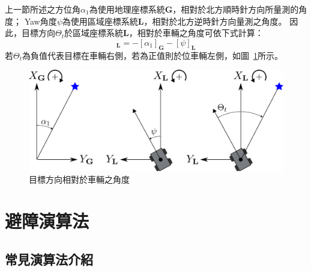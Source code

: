 上一節所述之方位角$\alpha_1$為使用地理座標系統$\mathbf{G}$，相對於北方順時針方向所量測的角度；
Yaw角度$\psi$為使用區域座標系統$\mathbf{L}$，相對於北方逆時針方向量測之角度。
因此，目標方向$\Theta_t$於區域座標系統$\mathbf{L}$，相對於車輛之角度可依下式計算：
\begin{equation}
	[\Theta_t]_{\mathbf{L}} = -[\alpha_1]_{\mathbf{G}} - [\psi]_{\mathbf{L}}
\end{equation}
若$\Theta_t$為負值代表目標在車輛右側，若為正值則於位車輛左側，如圖~\ref{f:target_angle}所示。
\begin{figure}[h!]
	\centering
	\includegraphics[width=\textwidth]{figures/algorithm/TargetAngle}
	\caption{目標方向相對於車輛之角度}
	\label{f:target_angle}
\end{figure}

\section{避障演算法}
\label{sec:vfhplus}

\subsection{常見演算法介紹}

